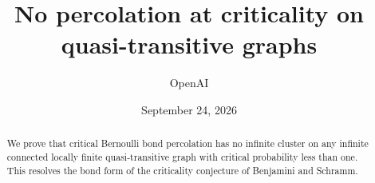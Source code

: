 \documentclass[11pt]{article}
\title{No percolation at criticality on quasi-transitive graphs}
\author{OpenAI}
\date{September 24, 2026}
\theoremstyle{definition}
\begin{document}
\maketitle
\begin{abstract}
We prove that critical Bernoulli bond percolation has no infinite
cluster on any infinite connected locally finite quasi-transitive graph
with critical probability less than one. This resolves the bond form of
the criticality conjecture of Benjamini and Schramm.
\end{abstract}
\tableofcontents












\end{document}
